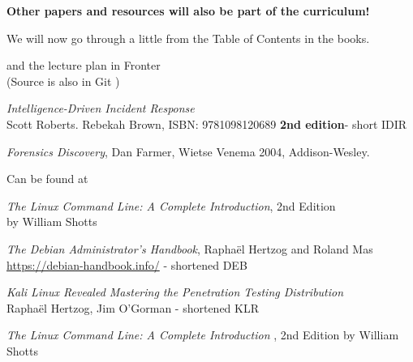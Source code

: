 \documentclass[Screen16to9,17pt]{foils}
\begin{document}
{\bf Other papers and resources will also be part of the curriculum!}


We will now go through a little from the Table of Contents in the books.

and the lecture plan in Fronter\\
(Source is also in Git  )



\emph{Intelligence-Driven Incident Response} \\
  Scott Roberts. Rebekah Brown, ISBN: 9781098120689 {\bf 2nd edition}- short IDIR




\emph{Forensics Discovery}, Dan Farmer, Wietse Venema 2004, Addison-Wesley.

Can be found at 





\begin{list2}
\item \emph{The Linux Command Line: A Complete Introduction}, 2nd Edition\\
 by William Shotts

\item \emph{The Debian Administrator’s Handbook}, Raphaël Hertzog and Roland Mas\\
\url{https://debian-handbook.info/} - shortened DEB
\item \emph{Kali Linux Revealed  Mastering the Penetration Testing Distribution}\\
Raphaël Hertzog, Jim O'Gorman - shortened KLR
\end{list2}






\emph{The Linux Command Line: A Complete Introduction }, 2nd Edition
by William Shotts
\end{document}
